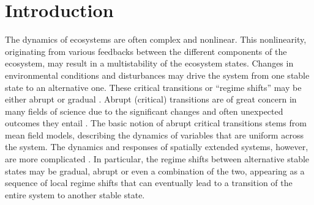 \documentclass[aps,prl,preprint,superscriptaddress,floatfix]{revtex4-1}
\begin{document}
\section{Introduction}\label{intro}
The dynamics of ecosystems are often complex and nonlinear. 
This nonlinearity, originating from various feedbacks between the different components of the ecosystem, may result in a multistability of the ecosystem states. 
Changes in environmental conditions and disturbances may drive the system from one stable state to an alternative one. 
These critical transitions or ``regime shifts'' may be either abrupt or gradual \cite{bel2012theo_ecol}. 
Abrupt (critical) transitions are of great concern in many fields of science due to the significant changes and often unexpected outcomes they entail \cite{Gandhi1998,Barnosky2012,Sun2013,Rietkerk2011,Dakos2012,Kefi2014,Cline2014}.
The basic notion of abrupt critical transitions stems from mean field models, describing the dynamics of variables that are uniform across the system.
The dynamics and responses of spatially extended systems, however, are more complicated \cite{Rietkerk2011,Dakos2012,Kefi2014,Cline2014,Fort2009,Fort2013review}. 
In particular, the regime shifts between alternative stable states may be gradual, abrupt or even a combination of the two, appearing as a sequence of local regime shifts that can eventually lead to a transition of the entire system to another stable state.
\end{document}
